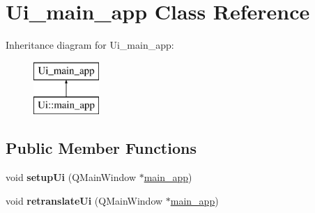 \hypertarget{class_ui__main__app}{}\section{Ui\+\_\+main\+\_\+app Class Reference}
\label{class_ui__main__app}
Inheritance diagram for Ui\+\_\+main\+\_\+app\+:\begin{figure}[H]
\begin{center}
\leavevmode
\includegraphics[height=2.000000cm]{class_ui__main__app}
\end{center}
\end{figure}
\subsection*{Public Member Functions}
\begin{DoxyCompactItemize}
\item 
\mbox{\label{class_ui__main__app_a871b21b48d08ff6e883ea1d6e2802c2f}} 
void {\bfseries setup\+Ui} (Q\+Main\+Window $\ast$\hyperlink{classmain__app}{main\+\_\+app})
\item 
\mbox{\label{class_ui__main__app_a2410d167474fef942bfe02515f309a93}} 
void {\bfseries retranslate\+Ui} (Q\+Main\+Window $\ast$\hyperlink{classmain__app}{main\+\_\+app})
\end{DoxyCompactItemize}
